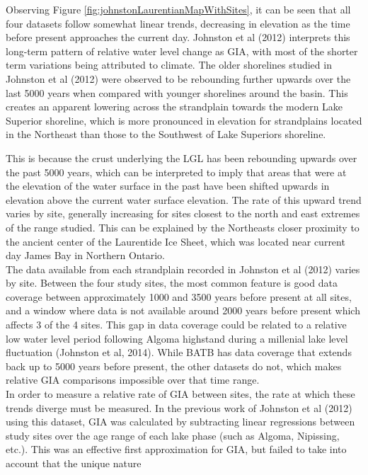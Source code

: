 \documentclass{article}
\begin{document}
 
 Observing Figure \ref{fig:johnstonLaurentianMapWithSites}, it can be seen that
 all four datasets follow somewhat
 linear trends, decreasing in elevation as the time before present approaches the
 current day. Johnston et al (2012) interprets this long-term pattern of relative
 water level change as GIA, with most of the shorter term variations being attributed
 to climate. The older shorelines studied in Johnston et al (2012) were observed
 to be rebounding further upwards over the last 5000 years when compared with
 younger shorelines around the basin. This creates an apparent lowering across
 the strandplain towards the modern Lake Superior shoreline, which is more pronounced
 in elevation for strandplains located in the Northeast than those to the Southwest
 of Lake Superiors shoreline.
 
 This is because the crust underlying the LGL has been rebounding upwards
 over the past 5000 years, which can be interpreted to imply that areas that were at the
 elevation of the water surface in the past have been shifted upwards in elevation
 above the current water surface elevation. The rate of this upward trend varies
 by site, generally increasing for sites closest to the north and east extremes
 of the range studied. This can be explained by the Northeasts closer proximity to 
 the ancient center of the Laurentide Ice Sheet, which was located near current day
 James Bay in Northern Ontario.\\
 The data available from each strandplain recorded in Johnston et al (2012) varies
 by site. Between the four study sites, the most common feature is good data coverage between
 approximately 1000 and 3500 years before present at all sites, and a window where data is not available around 2000
 years before present which affects 3 of the 4 sites. This gap in data coverage could be related to a 
 relative low water level period following Algoma highstand during a millenial lake level fluctuation
 (Johnston et al, 2014). While BATB has data
 coverage that extends back up to 5000 years before present, the other datasets do not, which makes relative GIA
 comparisons impossible over that time range.\\ 
 In order to measure a relative rate of GIA between sites, the rate at which these
 trends diverge must be measured. In the previous work of Johnston et al (2012) 
 using this dataset, GIA was calculated by subtracting linear regressions between
 study sites over the age range of each lake phase (such as Algoma, Nipissing, etc.). This was an
 effective first approximation for GIA, but failed to take into account that the unique nature
\end{document}
